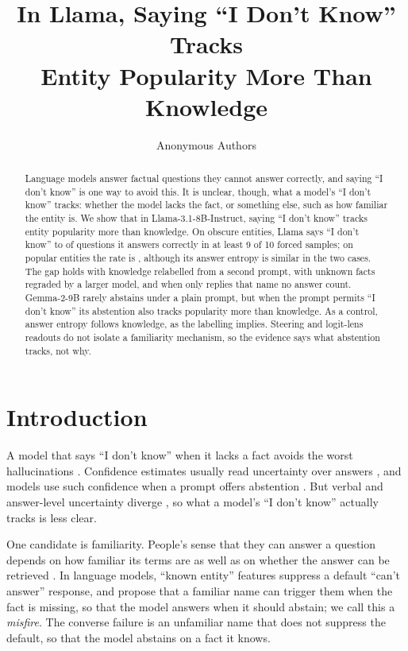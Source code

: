 \documentclass{article}
\title{In Llama, Saying ``I Don't Know'' Tracks\\Entity Popularity More Than Knowledge}
\author{Anonymous Authors}
\newcommand{\idk}{``I don't know''}
\begin{document}
\maketitle

\begin{abstract}
Language models answer factual questions they cannot answer correctly, and saying \idk{} is one way to avoid this. It is unclear, though, what a model's \idk{} tracks: whether the model lacks the fact, or something else, such as how familiar the entity is. We show that in Llama-3.1-8B-Instruct, saying \idk{} tracks entity popularity more than knowledge. On obscure entities, Llama says \idk{} to \tcObsKnownAbsPct{} of questions it answers correctly in at least 9 of 10 forced samples; on popular entities the rate is \tcPopKnownAbsPct, although its answer entropy is similar in the two cases. The gap holds with knowledge relabelled from a second prompt, with unknown facts regraded by a larger model, and when only replies that name no answer count. Gemma-2-9B rarely abstains under a plain prompt, but when the prompt permits \idk{} its abstention also tracks popularity more than knowledge. As a control, answer entropy follows knowledge, as the labelling implies. Steering and logit-lens readouts do not isolate a familiarity mechanism, so the evidence says what abstention tracks, not why.
\end{abstract}

\section{Introduction}

A model that says \idk{} when it lacks a fact avoids the worst hallucinations \citep{kalai2025hallucinate}. Confidence estimates usually read uncertainty over answers \citep{kadavath2022know,kuhn2023semantic,stolfo2024confidence}, and models use such confidence when a prompt offers abstention \citep{kumaran2026confidence}. But verbal and answer-level uncertainty diverge \citep{ji2025hedging}, so what a model's \idk{} actually tracks is less clear.

One candidate is familiarity. People's sense that they can answer a question depends on how familiar its terms are as well as on whether the answer can be retrieved \citep{reder1992,schwartz1992,koriat2001cascade}. In language models, ``known entity'' features suppress a default ``can't answer'' response, and \citet{lindsey2025biology} propose that a familiar name can trigger them when the fact is missing, so that the model answers when it should abstain; we call this a \emph{misfire}. The converse failure is an unfamiliar name that does not suppress the default, so that the model abstains on a fact it knows.
\end{document}

